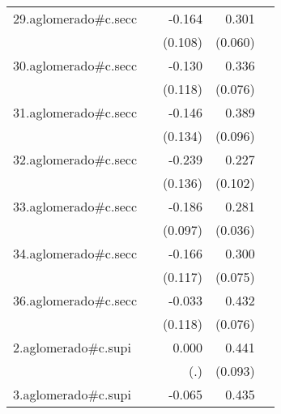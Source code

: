 {\begin{longtable}{l*{4}{D{.}{.}{-1}}}
\addlinespace
29.aglomerado#c.secc&                     &      -0.164         &       0.301\sym{***}&                     \\
            &                     &     (0.108)         &     (0.060)         &                     \\
\addlinespace
30.aglomerado#c.secc&                     &      -0.130         &       0.336\sym{***}&                     \\
            &                     &     (0.118)         &     (0.076)         &                     \\
\addlinespace
31.aglomerado#c.secc&                     &      -0.146         &       0.389\sym{***}&                     \\
            &                     &     (0.134)         &     (0.096)         &                     \\
\addlinespace
32.aglomerado#c.secc&                     &      -0.239         &       0.227\sym{*}  &                     \\
            &                     &     (0.136)         &     (0.102)         &                     \\
\addlinespace
33.aglomerado#c.secc&                     &      -0.186         &       0.281\sym{***}&                     \\
            &                     &     (0.097)         &     (0.036)         &                     \\
\addlinespace
34.aglomerado#c.secc&                     &      -0.166         &       0.300\sym{***}&                     \\
            &                     &     (0.117)         &     (0.075)         &                     \\
\addlinespace
36.aglomerado#c.secc&                     &      -0.033         &       0.432\sym{***}&                     \\
            &                     &     (0.118)         &     (0.076)         &                     \\
\addlinespace
2.aglomerado#c.supi&                     &       0.000         &       0.441\sym{***}&                     \\
            &                     &         (.)         &     (0.093)         &                     \\
\addlinespace
3.aglomerado#c.supi&                     &      -0.065         &       0.435\sym{***}&                     \\

\end{longtable}}
